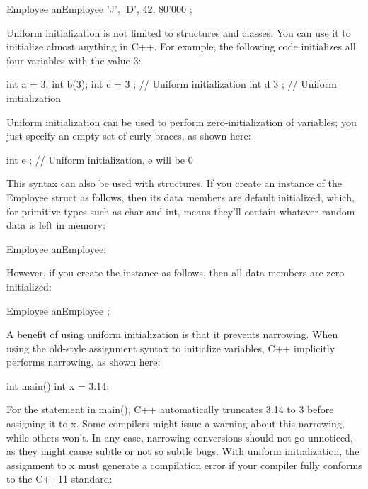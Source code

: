 \begin{cpp}
Employee anEmployee { 'J', 'D', 42, 80'000 };
\end{cpp}

Uniform initialization is not limited to structures and classes. You can use it to initialize almost anything in C++. For example, the following code initializes all four variables with the value 3:

\begin{cpp}
int a = 3;
int b(3);
int c = { 3 }; // Uniform initialization
int d { 3 }; // Uniform initialization
\end{cpp}

Uniform initialization can be used to perform zero-initialization of variables; you just specify an empty set of curly braces, as shown here:

\begin{cpp}
int e { }; // Uniform initialization, e will be 0
\end{cpp}

This syntax can also be used with structures. If you create an instance of the Employee struct as follows, then its data members are default initialized, which, for primitive types such as char and int, means they’ll contain whatever random data is left in memory:

\begin{cpp}
Employee anEmployee;
\end{cpp}

However, if you create the instance as follows, then all data members are zero initialized:

\begin{cpp}
Employee anEmployee { };
\end{cpp}

A benefit of using uniform initialization is that it prevents narrowing. When using the old-style assignment syntax to initialize variables, C++ implicitly performs narrowing, as shown here:

\begin{cpp}
int main()
{
    int x = 3.14;
}
\end{cpp}

For the statement in main(), C++ automatically truncates 3.14 to 3 before assigning it to x. Some compilers might issue a warning about this narrowing, while others won’t. In any case, narrowing conversions should not go unnoticed, as they might cause subtle or not so subtle bugs. With uniform initialization, the assignment to x must generate a compilation error if your compiler fully conforms to the C++11 standard:

